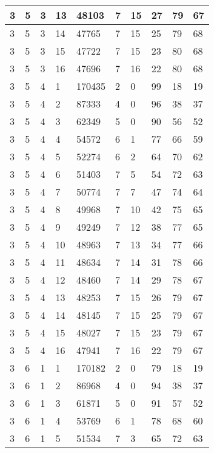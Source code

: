 \begin{table}[!ht]
\begin{tabular}{|l|l|l|l|l|l|l|l|l|l|}
        3 & 5 & 3 & 13 & 48103 & 7 & 15 & 27 & 79 & 67 \\ \hline
        3 & 5 & 3 & 14 & 47765 & 7 & 15 & 25 & 79 & 68 \\ \hline
        3 & 5 & 3 & 15 & 47722 & 7 & 15 & 23 & 80 & 68 \\ \hline
        3 & 5 & 3 & 16 & 47696 & 7 & 16 & 22 & 80 & 68 \\ \hline
        3 & 5 & 4 & 1 & 170435 & 2 & 0 & 99 & 18 & 19 \\ \hline
        3 & 5 & 4 & 2 & 87333 & 4 & 0 & 96 & 38 & 37 \\ \hline
        3 & 5 & 4 & 3 & 62349 & 5 & 0 & 90 & 56 & 52 \\ \hline
        3 & 5 & 4 & 4 & 54572 & 6 & 1 & 77 & 66 & 59 \\ \hline
        3 & 5 & 4 & 5 & 52274 & 6 & 2 & 64 & 70 & 62 \\ \hline
        3 & 5 & 4 & 6 & 51403 & 7 & 5 & 54 & 72 & 63 \\ \hline
        3 & 5 & 4 & 7 & 50774 & 7 & 7 & 47 & 74 & 64 \\ \hline
        3 & 5 & 4 & 8 & 49968 & 7 & 10 & 42 & 75 & 65 \\ \hline
        3 & 5 & 4 & 9 & 49249 & 7 & 12 & 38 & 77 & 65 \\ \hline
        3 & 5 & 4 & 10 & 48963 & 7 & 13 & 34 & 77 & 66 \\ \hline
        3 & 5 & 4 & 11 & 48634 & 7 & 14 & 31 & 78 & 66 \\ \hline
        3 & 5 & 4 & 12 & 48460 & 7 & 14 & 29 & 78 & 67 \\ \hline
        3 & 5 & 4 & 13 & 48253 & 7 & 15 & 26 & 79 & 67 \\ \hline
        3 & 5 & 4 & 14 & 48145 & 7 & 15 & 25 & 79 & 67 \\ \hline
        3 & 5 & 4 & 15 & 48027 & 7 & 15 & 23 & 79 & 67 \\ \hline
        3 & 5 & 4 & 16 & 47941 & 7 & 16 & 22 & 79 & 67 \\ \hline
        3 & 6 & 1 & 1 & 170182 & 2 & 0 & 79 & 18 & 19 \\ \hline
        3 & 6 & 1 & 2 & 86968 & 4 & 0 & 94 & 38 & 37 \\ \hline
        3 & 6 & 1 & 3 & 61871 & 5 & 0 & 91 & 57 & 52 \\ \hline
        3 & 6 & 1 & 4 & 53769 & 6 & 1 & 78 & 68 & 60 \\ \hline
        3 & 6 & 1 & 5 & 51534 & 7 & 3 & 65 & 72 & 63 \\ \hline

\end{tabular}
\end{table}
